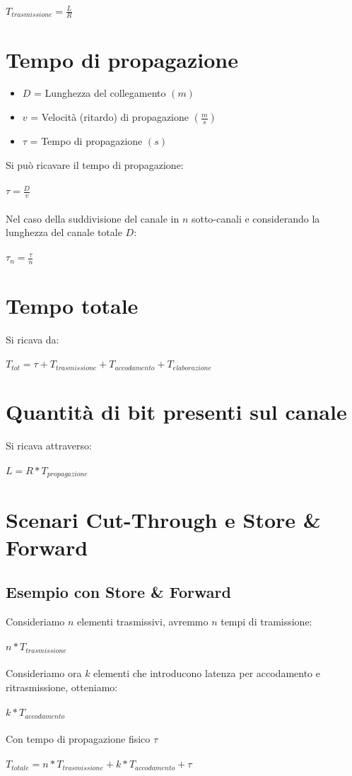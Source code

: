 \documentclass[a4paper]{report}
\begin{document}
	{$T_{\textit{trasmissione}} = \frac{L}{R}$ \label{em:transtime}
	\section{Tempo di propagazione}
	\begin{itemize}
		\item $D$ = Lunghezza del collegamento $(m)$
		\item $v$ = Velocità (ritardo) di propagazione $(\frac{m}{s})$
		\item $\tau$ = Tempo di propagazione $(s)$
	\end{itemize}
	Si può ricavare il tempo di propagazione:\\\\
	$\tau = \frac{D}{v}$\\\\
	Nel caso della suddivisione del canale in $n$ sotto-canali e considerando la lunghezza del canale totale $D$:\\\\ 
	$\tau_{n} = \frac{\tau}{n}$
	\section{Tempo totale}
	Si ricava da:\\\\
	$T_{\textit{tot}} = \tau + T_{\textit{trasmissione}} + T_{\textit{accodamento}} + T_{\textit{elaborazione}}$
	\section{Quantità di bit presenti sul canale}
	Si ricava attraverso:\\\\
	$L = R * T_{\textit{propagazione}}$
	\section{Scenari Cut-Through e Store \& Forward}
	\subsection{Esempio con Store \& Forward}
	Consideriamo $n$ elementi trasmissivi, avremmo $n$ tempi di tramissione: \\\\ 
	$n * T_{trasmissione}$ \\\\
	Consideriamo ora $k$ elementi che introducono latenza per accodamento e ritrasmissione, otteniamo: \\\\
	$k * T_{accodamento}$\\\\
	Con tempo di propagazione fisico $\tau$ \\\\
	$T_{totale} = n * T_{trasmissione} + k * T_{accodamento} + \tau$
}
\end{document}
